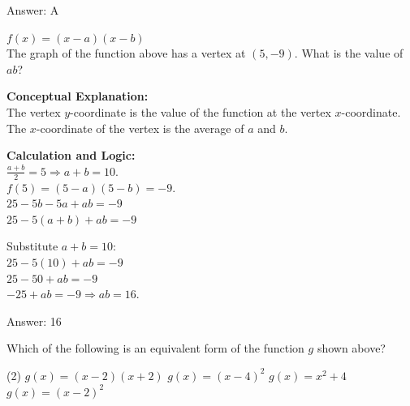 \documentclass[11pt,paper=a4,answers]{exam}
\begin{document}
\begin{questions}
\begin{solution}
\vspace{25pt}

Answer: \colorbox{yellow!100}{A}
\end{solution}

\vspace{40pt}

\question
$f(x) = (x-a)(x-b)$ \\
The graph of the function above has a vertex at $(5, -9)$. What is the value of $ab$?

\begin{solution}
\textbf{Conceptual Explanation:} \\
The vertex $y$-coordinate is the value of the function at the vertex $x$-coordinate. The $x$-coordinate of the vertex is the average of $a$ and $b$.

\vspace{20pt}

\textbf{Calculation and Logic:} \\
$\frac{a+b}{2} = 5 \Rightarrow a+b = 10$. \\
$f(5) = (5-a)(5-b) = -9$. \\
$25 - 5b - 5a + ab = -9$ \\
$25 - 5(a+b) + ab = -9$

\vspace{10pt}

Substitute $a+b = 10$: \\
$25 - 5(10) + ab = -9$ \\
$25 - 50 + ab = -9$ \\
$-25 + ab = -9 \Rightarrow ab = 16$.

\vspace{25pt}

Answer: \colorbox{yellow!100}{16}
\end{solution}

\vspace{40pt}

\question
\begin{center}
\end{center}
Which of the following is an equivalent form of the function $g$ shown above?
\begin{tasks}(2)
    \task $g(x) = (x-2)(x+2)$
    \task $g(x) = (x-4)^2$
    \task $g(x) = x^2 + 4$
    \task $g(x) = (x-2)^2$
\end{tasks}


\end{questions}
\end{document}
